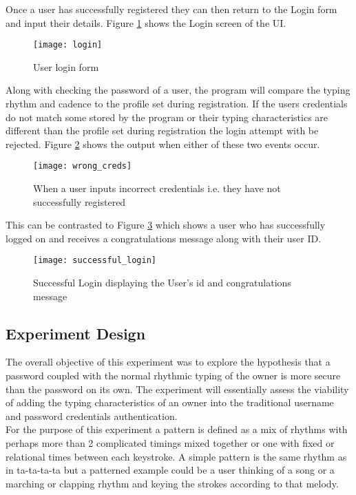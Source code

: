 \documentclass{article}
\begin{document}
Once a user has successfully registered they can then return to the Login form and input their details. Figure \ref{fig:login} shows the Login screen of the UI. 

\begin{figure}[H]
    \centering
    \texttt{[image: login]}
    \caption{User login form}
    \label{fig:login}
\end{figure}

Along with checking the password of a user, the program will compare the typing rhythm and cadence to the profile set during registration. If the users credentials do not match some stored by the program or their typing characteristics are different than the profile set during registration the login attempt with be rejected. Figure \ref{fig:wrong_creds} shows the output when either of these two events occur.  


\begin{figure}[H]
    \centering
    \texttt{[image: wrong\_creds]}
    \caption{When a user inputs incorrect credentials i.e. they have not successfully registered}
    \label{fig:wrong_creds}
\end{figure}

This can be contrasted to Figure \ref{fig:successful_login} which shows a user who has successfully logged on and receives a congratulations message along with their user ID.

\begin{figure}[H]
    \centering
    \texttt{[image: successful\_login]}
    \caption{Successful Login displaying the User's id and congratulations message}
    \label{fig:successful_login}
\end{figure}

\subsection{Experiment Design}
The overall objective of this experiment was to explore the hypothesis that a password coupled with the normal rhythmic typing of the owner is more secure than the password on its own. The experiment will essentially assess the viability of adding the typing characteristics of an owner into the traditional username and password credentials authentication. \\ 

For the purpose of this experiment a pattern is defined as a mix of rhythms with perhaps more than 2 complicated timings mixed together or one with fixed or relational times between each keystroke. A simple pattern is the same rhythm as in ta-ta-ta-ta but a patterned example could be a user thinking of a song or a marching or clapping rhythm and keying the strokes according to that melody. \\
\end{document}
